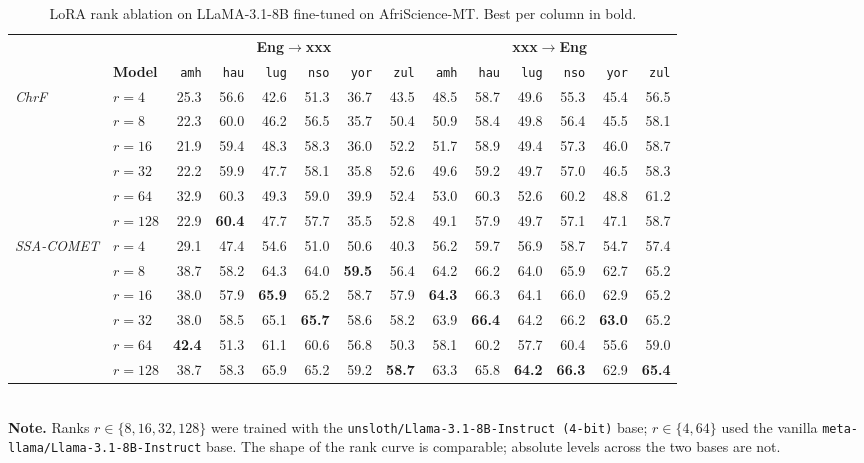 \begin{table}[t!]
\centering
\footnotesize
\setlength{\tabcolsep}{4pt}
\renewcommand{\arraystretch}{1.05}
\caption{LoRA rank ablation on LLaMA-3.1-8B fine-tuned on AfriScience-MT. Best per column in bold.}
\label{tab:lora_rank}
\begin{tabular}{llrrrrrrrrrrrr}
\toprule
 & & \multicolumn{6}{c}{\textbf{Eng$\to$xxx}} & \multicolumn{6}{c}{\textbf{xxx$\to$Eng}} \\
\cmidrule(lr){3-8}\cmidrule(lr){9-14}
 & \textbf{Model} & \texttt{amh} & \texttt{hau} & \texttt{lug} & \texttt{nso} & \texttt{yor} & \texttt{zul} & \texttt{amh} & \texttt{hau} & \texttt{lug} & \texttt{nso} & \texttt{yor} & \texttt{zul} \\
\midrule
\multirow{6}{*}{\textit{ChrF}} & $r{=}4$ & 25.3 & 56.6 & 42.6 & 51.3 & 36.7 & 43.5 & 48.5 & 58.7 & 49.6 & 55.3 & 45.4 & 56.5 \\
 & $r{=}8$ & 22.3 & 60.0 & 46.2 & 56.5 & 35.7 & 50.4 & 50.9 & 58.4 & 49.8 & 56.4 & 45.5 & 58.1 \\
 & $r{=}16$ & 21.9 & 59.4 & 48.3 & 58.3 & 36.0 & 52.2 & 51.7 & 58.9 & 49.4 & 57.3 & 46.0 & 58.7 \\
 & $r{=}32$ & 22.2 & 59.9 & 47.7 & 58.1 & 35.8 & 52.6 & 49.6 & 59.2 & 49.7 & 57.0 & 46.5 & 58.3 \\
 & $r{=}64$ & 32.9 & 60.3 & 49.3 & 59.0 & 39.9 & 52.4 & 53.0 & 60.3 & 52.6 & 60.2 & 48.8 & 61.2 \\
 & $r{=}128$ & 22.9 & \textbf{60.4} & 47.7 & 57.7 & 35.5 & 52.8 & 49.1 & 57.9 & 49.7 & 57.1 & 47.1 & 58.7 \\
\midrule
\multirow{6}{*}{\textit{SSA-COMET}} & $r{=}4$ & 29.1 & 47.4 & 54.6 & 51.0 & 50.6 & 40.3 & 56.2 & 59.7 & 56.9 & 58.7 & 54.7 & 57.4 \\
 & $r{=}8$ & 38.7 & 58.2 & 64.3 & 64.0 & \textbf{59.5} & 56.4 & 64.2 & 66.2 & 64.0 & 65.9 & 62.7 & 65.2 \\
 & $r{=}16$ & 38.0 & 57.9 & \textbf{65.9} & 65.2 & 58.7 & 57.9 & \textbf{64.3} & 66.3 & 64.1 & 66.0 & 62.9 & 65.2 \\
 & $r{=}32$ & 38.0 & 58.5 & 65.1 & \textbf{65.7} & 58.6 & 58.2 & 63.9 & \textbf{66.4} & 64.2 & 66.2 & \textbf{63.0} & 65.2 \\
 & $r{=}64$ & \textbf{42.4} & 51.3 & 61.1 & 60.6 & 56.8 & 50.3 & 58.1 & 60.2 & 57.7 & 60.4 & 55.6 & 59.0 \\
 & $r{=}128$ & 38.7 & 58.3 & 65.9 & 65.2 & 59.2 & \textbf{58.7} & 63.3 & 65.8 & \textbf{64.2} & \textbf{66.3} & 62.9 & \textbf{65.4} \\
\bottomrule
\end{tabular}
\\[2pt]\footnotesize{\textbf{Note.} Ranks $r{\in}\{8,16,32,128\}$ were trained with the \texttt{unsloth/Llama-3.1-8B-Instruct (4-bit)} base; $r{\in}\{4,64\}$ used the vanilla \texttt{meta-llama/Llama-3.1-8B-Instruct} base. The shape of the rank curve is comparable; absolute levels across the two bases are not.}
\end{table}